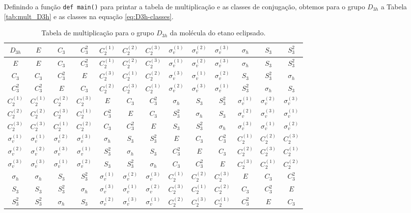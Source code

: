 \documentclass[a4paper,10pt]{article}
\newcommand{\python}[1]{\texttt{#1}}
\begin{document}
Definindo a função \python{def main()} para printar a tabela de multiplicação e as classes de conjugação, obtemos para o grupo $D_{3h}$ a Tabela \ref{tab:mult_D3h} e as classes na equação \ref{eq:D3h-classes}.

\begin{table}[ht]
\caption{Tabela de multiplicação para o grupo $D_{3h}$ da molécula do etano eclipsado.}
\centering

\begin{tabular} { |c|c c c c c c c c c c c c | }
\hline
$D_{3h}$ & $E$ & $C_3$ & $C_3^2$ & $C_2^{(1)}$ & $C_2^{(2)}$ & $C_2^{(3)}$ & $\sigma_v^{(1)}$ & $\sigma_v^{(2)}$ & $\sigma_v^{(3)}$ & $\sigma_h$ & $S_3$ & $S_3^2$ \\
\hline
$E$ & $E$ & $C_3$ & $C_3^2$ & $C_2^{(1)}$ & $C_2^{(2)}$ & $C_2^{(3)}$ & $\sigma_v^{(1)}$ & $\sigma_v^{(2)}$ & $\sigma_v^{(3)}$ & $\sigma_h$ & $S_3$ & $S_3^2$ \\
$C_3$ & $C_3$ & $C_3^2$ & $E$ & $C_2^{(3)}$ & $C_2^{(1)}$ & $C_2^{(2)}$ & $\sigma_v^{(3)}$ & $\sigma_v^{(1)}$ & $\sigma_v^{(2)}$ & $S_3$ & $S_3^2$ & $\sigma_h$ \\
$C_3^2$ & $C_3^2$ & $E$ & $C_3$ & $C_2^{(2)}$ & $C_2^{(3)}$ & $C_2^{(1)}$ & $\sigma_v^{(2)}$ & $\sigma_v^{(3)}$ & $\sigma_v^{(1)}$ & $S_3^2$ & $\sigma_h$ & $S_3$ \\
$C_2^{(1)}$ & $C_2^{(1)}$ & $C_2^{(2)}$ & $C_2^{(3)}$ & $E$ & $C_3$ & $C_3^2$ & $\sigma_h$ & $S_3$ & $S_3^2$ & $\sigma_v^{(1)}$ & $\sigma_v^{(2)}$ & $\sigma_v^{(3)}$ \\
$C_2^{(2)}$ & $C_2^{(2)}$ & $C_2^{(3)}$ & $C_2^{(1)}$ & $C_3^2$ & $E$ & $C_3$ & $S_3^2$ & $\sigma_h$ & $S_3$ & $\sigma_v^{(2)}$ & $\sigma_v^{(3)}$ & $\sigma_v^{(1)}$ \\
$C_2^{(3)}$ & $C_2^{(3)}$ & $C_2^{(1)}$ & $C_2^{(2)}$ & $C_3$ & $C_3^2$ & $E$ & $S_3$ & $S_3^2$ & $\sigma_h$ & $\sigma_v^{(3)}$ & $\sigma_v^{(1)}$ & $\sigma_v^{(2)}$ \\
$\sigma_v^{(1)}$ & $\sigma_v^{(1)}$ & $\sigma_v^{(2)}$ & $\sigma_v^{(3)}$ & $\sigma_h$ & $S_3$ & $S_3^2$ & $E$ & $C_3$ & $C_3^2$ & $C_2^{(1)}$ & $C_2^{(2)}$ & $C_2^{(3)}$ \\
$\sigma_v^{(2)}$ & $\sigma_v^{(2)}$ & $\sigma_v^{(3)}$ & $\sigma_v^{(1)}$ & $S_3^2$ & $\sigma_h$ & $S_3$ & $C_3^2$ & $E$ & $C_3$ & $C_2^{(2)}$ & $C_2^{(3)}$ & $C_2^{(1)}$ \\
$\sigma_v^{(3)}$ & $\sigma_v^{(3)}$ & $\sigma_v^{(1)}$ & $\sigma_v^{(2)}$ & $S_3$ & $S_3^2$ & $\sigma_h$ & $C_3$ & $C_3^2$ & $E$ & $C_2^{(3)}$ & $C_2^{(1)}$ & $C_2^{(2)}$ \\
$\sigma_h$ & $\sigma_h$ & $S_3$ & $S_3^2$ & $\sigma_v^{(1)}$ & $\sigma_v^{(2)}$ & $\sigma_v^{(3)}$ & $C_2^{(1)}$ & $C_2^{(2)}$ & $C_2^{(3)}$ & $E$ & $C_3$ & $C_3^2$ \\
$S_3$ & $S_3$ & $S_3^2$ & $\sigma_h$ & $\sigma_v^{(3)}$ & $\sigma_v^{(1)}$ & $\sigma_v^{(2)}$ & $C_2^{(3)}$ & $C_2^{(1)}$ & $C_2^{(2)}$ & $C_3$ & $C_3^2$ & $E$ \\
$S_3^2$ & $S_3^2$ & $\sigma_h$ & $S_3$ & $\sigma_v^{(2)}$ & $\sigma_v^{(3)}$ & $\sigma_v^{(1)}$ & $C_2^{(2)}$ & $C_2^{(3)}$ & $C_2^{(1)}$ & $C_3^2$ & $E$ & $C_3$ \\
\hline
\end{tabular}


\end{table}
\end{document}
